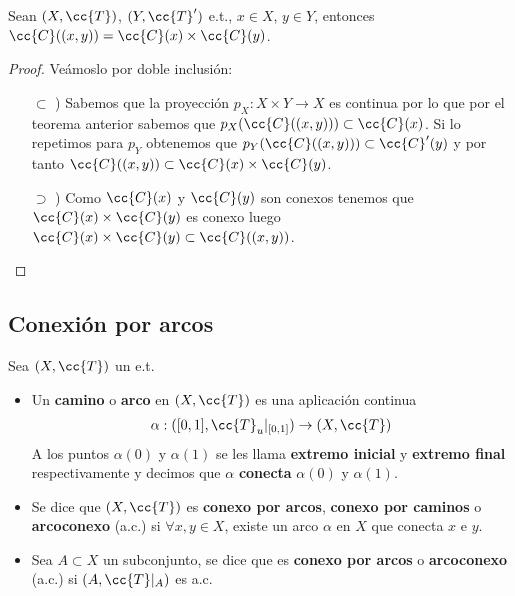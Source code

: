 \begin{prop}
    Sean $(X, \cc{T})$, $(Y, \cc{T}')$ e.t., $x\in X$, $y\in Y$, entonces $\cc{C}((x,y))=\cc{C}(x)\times \cc{C}(y)$.
    \begin{proof}
        Veámoslo por doble inclusión:
        \begin{itemize}
            \item[$\subset$ )] Sabemos que la proyección $p_X:X\times Y \to X$ es continua por lo que por el teorema anterior sabemos que $p_X(\cc{C}((x,y)))\subset \cc{C}(x)$. Si lo repetimos para $p_Y$ obtenemos que $p_Y(\cc{C}((x,y)))\subset \cc{C}'(y)$ y por tanto $\cc{C}((x,y))\subset\cc{C}(x)\times \cc{C}(y)$.
            \item[$\supset$ )] Como $\cc{C}(x)$ y $\cc{C}(y)$ son conexos tenemos que $\cc{C}(x)\times \cc{C}(y)$ es conexo luego $\cc{C}(x)\times \cc{C}(y)\subset \cc{C}((x,y))$.
        \end{itemize}
    \end{proof}
\end{prop}

\subsection{Conexión por arcos}

\begin{definicion}
    Sea $(X, \cc{T})$ un e.t. 
    \begin{itemize}
        \item Un \textbf{camino} o \textbf{arco} en $(X, \cc{T})$ es una aplicación continua 
        \begin{align*}
            \alpha: ([0,1], \cc{T}_u|_{[0,1]})\to (X, \cc{T})
        \end{align*}
        A los puntos $\alpha(0)$ y $\alpha(1)$ se les llama \textbf{extremo inicial} y \textbf{extremo final} respectivamente y decimos que $\alpha$ \textbf{conecta} $\alpha(0)$ y $\alpha(1)$. 

        \item Se dice que $(X, \cc{T})$ es \textbf{conexo por arcos}, \textbf{conexo por caminos} o \textbf{arcoconexo} (a.c.) si $\forall x,y\in X$, existe un arco $\alpha$ en $X$ que conecta $x$ e $y$.

        \item Sea $A\subset X$ un subconjunto, se dice que es \textbf{conexo por arcos} o \textbf{arcoconexo} (a.c.) si $(A, \cc{T}|_A)$ es a.c.
     \end{itemize}
\end{definicion}

